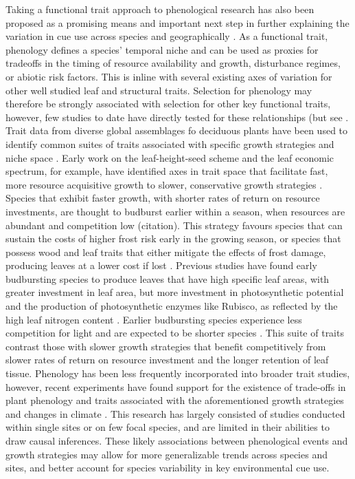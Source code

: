 \documentclass{article}\usepackage[]{graphicx}\usepackage[]{color}
\begin{document}
Taking a functional trait approach to phenological research has also been proposed as a promising means and important next step in further explaining the variation in cue use across species and geographically \citep{Flynn2018,Osada2017}. As a functional trait, phenology defines a species' temporal niche and can be used as proxies for tradeoffs in the timing of resource availability and growth, disturbance regimes, or abiotic risk factors. This is inline with several existing axes of variation for other well studied leaf and structural traits. Selection for phenology may therefore be strongly associated with selection for other key functional traits, however, few studies to date have directly tested for these relationships (but see \citep{Osada2017,Sun2006,Lechowicz1984}. Trait data from diverse global assemblages fo deciduous plants have been used to identify common suites of traits associated with specific growth strategies and niche space \citep{Westoby1998,Wright2004,Chave2009}. Early work on the leaf-height-seed scheme and the leaf economic spectrum, for example, have identified axes in trait space that facilitate fast, more resource acquisitive growth to slower, conservative growth strategies \citep{Westoby1998,Wright2004,Diaz2016,Chave2009,Funk2016}. Species that exhibit faster growth, with shorter rates of return on resource investments, are thought to budburst earlier within a season, when resources are abundant and competition low (citation). This strategy favours species that can sustain the costs of higher frost risk early in the growing season, or species that possess wood and leaf traits that either mitigate the effects of frost damage, producing leaves at a lower cost if lost \citep{Lechowicz1984,Lenz2016}. Previous studies have found early budbursting species to produce leaves that have high specific leaf areas, with greater investment in leaf area, but more investment in photosynthetic potential and the production of photosynthetic enzymes like Rubisco, as reflected by the high leaf nitrogen content \citep{Pereira2020}. Earlier budbursting species experience less competition for light and are expected to be shorter species \citep{Laughlin2010}. This suite of traits contrast those with slower growth strategies that benefit competitively from slower rates of return on resource investment and the longer retention of leaf tissue. Phenology has been less frequently incorporated into broader trait studies, however, recent experiments have found support for the existence of trade-offs in plant phenology and traits associated with the aforementioned growth strategies and changes in climate \citep{Suzuki1997,Ishioka2013}. This research has largely consisted of studies conducted within single sites or on few focal species, and are limited in their abilities to draw causal inferences. These likely associations between phenological events and growth strategies may allow for more generalizable trends across species and sites, and better account for species variability in key environmental cue use. 
 
\end{document}

